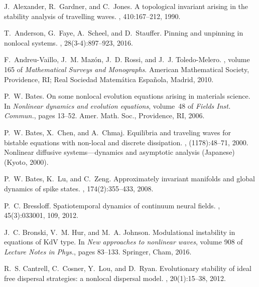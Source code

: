 \begin{thebibliography}{10}

J.~Alexander, R.~Gardner, and C.~Jones.
\newblock A topological invariant arising in the stability analysis of
  travelling waves.
, 410:167--212, 1990.

T.~Anderson, G.~Faye, A.~Scheel, and D.~Stauffer.
\newblock Pinning and unpinning in nonlocal systems.
, 28(3-4):897--923, 2016.

F.~Andreu-Vaillo, J.~M. Maz\'on, J.~D. Rossi, and J.~J. Toledo-Melero.
, volume 165 of {\em Mathematical
  Surveys and Monographs}.
\newblock American Mathematical Society, Providence, RI; Real Sociedad
  Matem\'atica Espa\~nola, Madrid, 2010.

P.~W. Bates.
\newblock On some nonlocal evolution equations arising in materials science.
\newblock In {\em Nonlinear dynamics and evolution equations}, volume~48 of
  {\em Fields Inst. Commun.}, pages 13--52. Amer. Math. Soc., Providence, RI,
  2006.

P.~W. Bates, X.~Chen, and A.~Chmaj.
\newblock Equilibria and traveling waves for bistable equations with non-local
  and discrete dissipation.
, (1178):48--71, 2000.
\newblock Nonlinear diffusive systems---dynamics and asymptotic analysis
  (Japanese) (Kyoto, 2000).

P.~W. Bates, K.~Lu, and C.~Zeng.
\newblock Approximately invariant manifolds and global dynamics of spike
  states.
, 174(2):355--433, 2008.

P.~C. Bressloff.
\newblock Spatiotemporal dynamics of continuum neural fields.
, 45(3):033001, 109, 2012.

J.~C. Bronski, V.~M. Hur, and M.~A. Johnson.
\newblock Modulational instability in equations of {K}d{V} type.
\newblock In {\em New approaches to nonlinear waves}, volume 908 of {\em
  Lecture Notes in Phys.}, pages 83--133. Springer, Cham, 2016.

R.~S. Cantrell, C.~Cosner, Y.~Lou, and D.~Ryan.
\newblock Evolutionary stability of ideal free dispersal strategies: a nonlocal
  dispersal model.
, 20(1):15--38, 2012.


\end{thebibliography}

